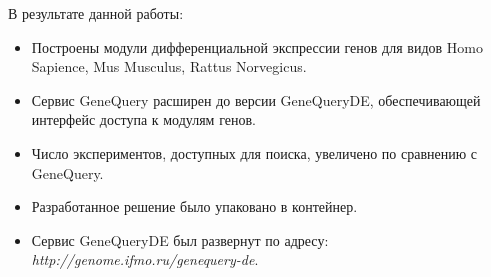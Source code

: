 \documentclass[times,specification,annotation]{itmo-student-thesis}
\begin{document}
\startconclusionpage

В результате данной работы:
\begin{itemize}
    \item Построены модули дифференциальной экспрессии генов для видов Homo Sapience, Mus Musculus, Rattus Norvegicus.
    \item Сервис GeneQuery расширен до версии GeneQueryDE, обеспечивающей интерфейс доступа к модулям генов. 
    \item Число экспериментов, доступных для поиска, увеличено по сравнению с GeneQuery. 
    \item Разработанное решение было упаковано в контейнер.
    \item Сервис GeneQueryDE был развернут по адресу: \textit{http://genome.ifmo.ru/genequery-de}.​
\end{itemize}

\printmainbibliography
\end{document}
